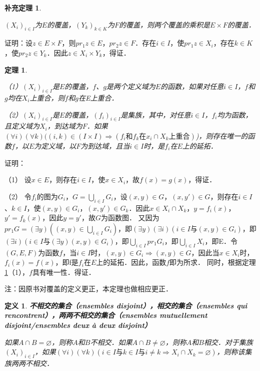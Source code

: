 \documentclass[12pt, a4paper, oneside]{book}
\newtheorem{theo}{定理}
\newtheorem{cor}{补充定理}
\newtheorem{de}{定义}
\begin{document}
			\begin{cor}\label{cor112}
				\hfill\par
				$(X_i)_{i\in I}$为$E$的覆盖，$(Y_k)_{k\in K}$为$F$的覆盖，则两个覆盖的乘积是$E\times F$的覆盖．
			\end{cor}
			证明：设$z\in E\times F$，则$pr_1z\in E$，$pr_2z\in F$．存在$i\in I$，使$pr_1z\in X_i$，存在$k\in K$，使$pr_2z\in Y_k$．因此$z\in X_i\times Y_k$，得证．
			
			\begin{theo}\label{theo32}
				\hfill\par
				（1）$(X_i)_{i\in I}$是$E$的覆盖，$f$、$g$是两个定义域为$E$的函数，如果对任意$i\in I$，$f$和$g$均在$X_i$上重合，则$f$和$g$在E上重合．
				\par
				（2）$(X_i)_{i\in I}$是$E$的覆盖，$(f_i)_{i\in I}$是集族，其中，对任意$i\in I$，$f_i$均为函数，且定义域为$X_i$，到达域为$F$．如果$(\forall i)(\forall k)((i, k)\in (I\times I)\Rightarrow (f_i\text{和}f_k\text{在}x_i\cap X_k\text{上重合})$)，则存在唯一的函数$f$，以$E$为定义域，以$F$为到达域，且当$i\in I$时，是$f_i$在$E$上的延拓．
			\end{theo}
			证明：
			\par
			（1）	设$x\in E$，则存在$i\in I$，使$x\in X_i$，故$f(x)=g(x)$，得证．
			\par
			（2）	令$f_i$的图为$G_i$，$G=\bigcup\limits_{i\in I}G_i$，设$(x, y)\in G$，$(x, y')\in G$，则存在$i\in I$、$k\in I$，使$(x, y)\in G_i$，$(x, y')\in G_k$．因此$x\in X_i\cap X_k$，$y=f_i(x)$，$y'=f_k(x)$，因此$y=y'$，故$G$为函数图．
			又因为$pr_1G=(\exists y)((x, y)\in \bigcup\limits_{i\in I}G_i)$，即$(\exists y)(\exists i)(i\in I\text{与}(x, y)\in G_i)$，即$(\exists i)(i\in I\text{与}(\exists y)(x, y)\in G_i)$，即$\bigcup\limits_{i\in I}pr_1G_i$，即$\bigcup\limits_{i\in I}X_i$，即E．令$(G, E, F)$为函数$f$，当$i\in I$时，$(x, y) \in G_i\Rightarrow (x, y) \in G$，因此当$x\in X_i$时，$f_i(x)=f(x)$，即f是$f_i$在$E$上的延拓．因此，函数$f$即为所求．
			同时，根据定理\ref{theo32}（1），$f$具有唯一性．得证．
			\par
			注：因原书对覆盖的定义更正，本定理也做相应更正．			

			\begin{de}
				\textbf{不相交的集合（ensembles disjoint），相交的集合（ensembles qui rencontrent），两两不相交的集合（ensembles mutuellement disjoint/ensembles deux à deux disjoint）}
				\par
				如果$A\cap B=\varnothing$，则称$A$和$B$不相交．如果$A\cap B\neq \varnothing$，则称$A$和$B$相交．对于集族$(X_i)_{i\in I}$，如果$(\forall i)(\forall k)(i\in I\text{与}k\in I\text{与}i\neq k\Rightarrow X_i\cap X_k=\varnothing)$，则称该集族两两不相交．
			\end{de}
						
\end{document}
